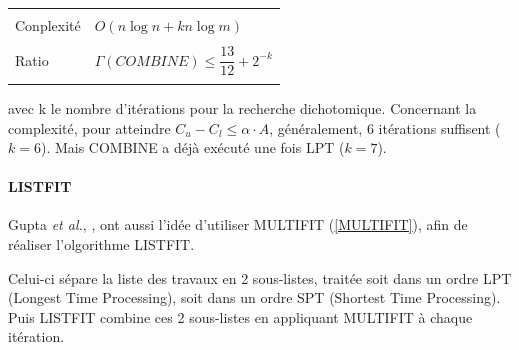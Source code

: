 \documentclass[a4paper,12pt]{report}
\theoremstyle{plain}				%
\theoremstyle{definition}				%
\begin{document}
\bigskip

\begin{flushleft}
\begin{tabular}{|p{8cm}p{6cm}|}
\hline

 & \\

Conplexité & $O(n \log n + kn \log m)$
\\	%

 & \\

Ratio \cite{gupta2001listfit} & $\Gamma(COMBINE) \leq \dfrac{13}{12} + 2^{-k}$

\\

& \\
\hline
\end{tabular}
\end{flushleft}

avec k le nombre d'itérations pour la recherche dichotomique.
Concernant la complexité, pour atteindre
$C_u - C_l \leq \alpha \cdot A$, généralement, 6 itérations suffisent
($k=6$).
Mais COMBINE a déjà exécuté une fois LPT ($k=7$).




\paragraph{LISTFIT}

Gupta \textit{et al.}, \cite{gupta2001listfit}, ont aussi l'idée
d'utiliser MULTIFIT (\ref{MULTIFIT}), afin de réaliser l'olgorithme
LISTFIT.

Celui-ci sépare la liste des travaux en 2 sous-listes, traitée soit
dans un ordre LPT (Longest Time Processing), soit dans un ordre SPT
(Shortest Time Processing).
Puis LISTFIT combine ces 2 sous-listes en appliquant MULTIFIT à chaque
itération.
\end{document}
